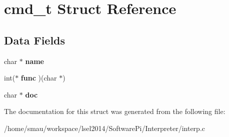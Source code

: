 \hypertarget{structcmd__t}{\section{cmd\-\_\-t Struct Reference}
\label{structcmd__t}
}
\subsection*{Data Fields}
\begin{DoxyCompactItemize}
\item 
\hypertarget{structcmd__t_a3f68deb0d248a9928175d9ce05ae669e}{char $\ast$ {\bfseries name}}\label{structcmd__t_a3f68deb0d248a9928175d9ce05ae669e}

\item 
\hypertarget{structcmd__t_a4889682ce1ad725a999caccad6614cae}{int($\ast$ {\bfseries func} )(char $\ast$)}\label{structcmd__t_a4889682ce1ad725a999caccad6614cae}

\item 
\hypertarget{structcmd__t_a81b60ae5e66f4a8f07e294012ef07c9c}{char $\ast$ {\bfseries doc}}\label{structcmd__t_a81b60ae5e66f4a8f07e294012ef07c9c}

\end{DoxyCompactItemize}


The documentation for this struct was generated from the following file\-:\begin{DoxyCompactItemize}
\item 
/home/smau/workspace/lsel2014/\-Software\-Pi/\-Interpreter/interp.\-c\end{DoxyCompactItemize}
